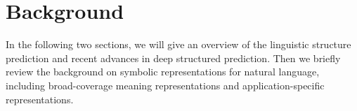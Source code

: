
\chapter{Background}
\label{chap:background}

In the following two sections, we will give an overview of the
linguistic structure prediction and recent advances in deep structured
prediction.  Then we briefly review the background on symbolic
representations for natural language, including broad-coverage meaning
representations and application-specific representations.






